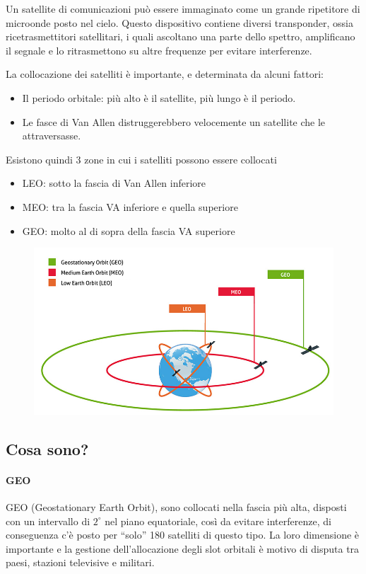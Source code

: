 Un satellite di comunicazioni può essere immaginato come un grande ripetitore di microonde posto nel cielo. Questo dispositivo contiene diversi transponder, ossia ricetrasmettitori satellitari, i quali ascoltano una parte dello spettro, amplificano il segnale e lo ritrasmettono su altre frequenze per evitare interferenze.

La collocazione dei satelliti è importante, e determinata da alcuni fattori:
\begin{itemize}
\item	Il periodo orbitale: più alto è il satellite, più lungo è il periodo.
\item	Le fasce di Van Allen distruggerebbero velocemente un satellite che le attraversasse.
\end{itemize}
Esistono quindi 3 zone in cui i satelliti possono essere collocati
\begin{itemize}
\item LEO: sotto la fascia di Van Allen inferiore
\item MEO: tra la fascia VA inferiore e quella superiore
\item GEO: molto al di sopra della fascia VA superiore
\end{itemize}

\begin{figure}[H]
\centering
\includegraphics[scale=0.55]{res/img/4_satelliti.png}
\end{figure}
\subsection{Cosa sono?}
\paragraph{GEO}
GEO (Geostationary Earth Orbit), sono collocati nella fascia più alta, disposti con un intervallo di $2^{\circ}$ nel piano equatoriale, così da evitare interferenze, di conseguenza c’è posto per “solo” 180 satelliti di questo tipo. La loro dimensione è importante e la gestione dell’allocazione degli slot orbitali è motivo di disputa tra paesi, stazioni televisive e militari.

